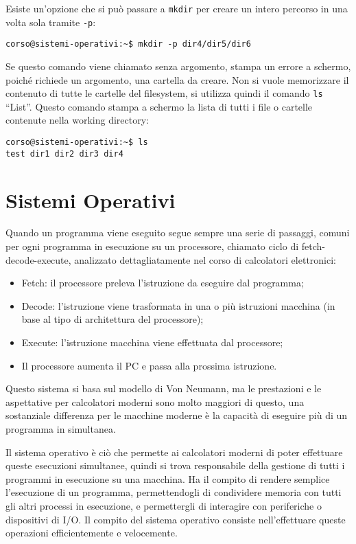 \documentclass{article}
\numberwithin{equation}{subsection}
\begin{document}
Esiste un'opzione che si può passare a \verb|mkdir| per creare un intero percorso in una volta sola tramite \verb|-p|:
\begin{verbatim}
corso@sistemi-operativi:~$ mkdir -p dir4/dir5/dir6
\end{verbatim}


Se questo comando viene chiamato senza argomento, stampa un errore a schermo, poiché richiede un argomento, una cartella da creare. Non si vuole memorizzare il contenuto di tutte le cartelle del filesystem, si 
utilizza quindi il comando \verb|ls| ``List''. Questo comando stampa a schermo la lista di tutti i file o cartelle contenute nella working directory:
\begin{verbatim}
corso@sistemi-operativi:~$ ls
test dir1 dir2 dir3 dir4
\end{verbatim}






\clearpage

\section{Sistemi Operativi}

Quando un programma viene eseguito segue sempre una serie di passaggi, comuni per ogni programma in esecuzione su un processore, chiamato ciclo di fetch-decode-execute, 
analizzato dettagliatamente nel corso di calcolatori elettronici:
\begin{itemize}
  \item Fetch: il processore preleva l'istruzione da eseguire dal programma;
  \item Decode: l'istruzione viene trasformata in una o più istruzioni macchina (in base al tipo di architettura del processore);
  \item Execute: l'istruzione macchina viene effettuata dal processore;
  \item Il processore aumenta il PC e passa alla prossima istruzione. 
\end{itemize}
Questo sistema si basa sul modello di Von Neumann, ma le prestazioni e le aspettative per calcolatori 
moderni sono molto maggiori di questo, una sostanziale differenza per le macchine moderne è la capacità di eseguire più di un programma in simultanea. 

Il sistema operativo è ciò che permette ai calcolatori moderni di poter effettuare queste esecuzioni simultanee, quindi si trova responsabile della gestione di tutti i 
programmi in esecuzione su una macchina. 
Ha il compito di rendere semplice l'esecuzione di un programma, permettendogli di condividere memoria con tutti gli altri processi in esecuzione, e permettergli di 
interagire con periferiche o dispositivi di I/O. Il compito del sistema operativo consiste nell'effettuare queste operazioni efficientemente e velocemente. 
\end{document}
